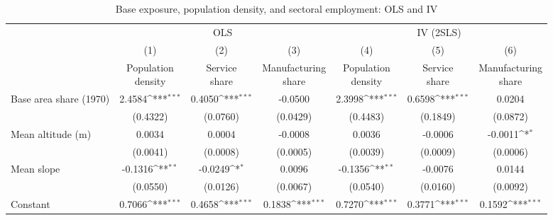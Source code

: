 \documentclass[12pt, unicode, a4paper]{article}
\newcommand{\1}{\mbox{1}\hspace{-0.25em}\mbox{l}} %
\begin{document}
\clearpage
\begin{table}[H]
\centering
\begin{threeparttable}
\caption{Base exposure, population density, and sectoral employment: OLS and IV}
\label{tab:base-location-ols-iv}
\small
\setlength{\tabcolsep}{3pt}
\def\sym#1{\ifmmode^{#1}\else\(^{#1}\)\fi}
\begin{tabular*}{\linewidth}{@{\extracolsep{\fill}}l*{6}{c}@{}}
\toprule
&\multicolumn{3}{c}{OLS}&\multicolumn{3}{c}{IV (2SLS)}\\
\cmidrule(lr){2-4}\cmidrule(lr){5-7}
& (1) & (2) & (3) & (4) & (5) & (6)\\
& \shortstack{Population\\density} & \shortstack{Service\\share} & \shortstack{Manufacturing\\share}
& \shortstack{Population\\density} & \shortstack{Service\\share} & \shortstack{Manufacturing\\share}\\
\midrule
Base area share (1970)    &        2.4584\sym{***}&        0.4050\sym{***}&       -0.0500         &        2.3998\sym{***}&        0.6598\sym{***}&        0.0204         \\
                          &      (0.4322)         &      (0.0760)         &      (0.0429)         &      (0.4483)         &      (0.1849)         &      (0.0872)         \\
Mean altitude (m)         &        0.0034         &        0.0004         &       -0.0008         &        0.0036         &       -0.0006         &       -0.0011\sym{*}  \\
                          &      (0.0041)         &      (0.0008)         &      (0.0005)         &      (0.0039)         &      (0.0009)         &      (0.0006)         \\
Mean slope                &       -0.1316\sym{**} &       -0.0249\sym{*}  &        0.0096         &       -0.1356\sym{**} &       -0.0076         &        0.0144         \\
                          &      (0.0550)         &      (0.0126)         &      (0.0067)         &      (0.0540)         &      (0.0160)         &      (0.0092)         \\
Constant                  &        0.7066\sym{***}&        0.4658\sym{***}&        0.1838\sym{***}&        0.7270\sym{***}&        0.3771\sym{***}&        0.1592\sym{***}\\

\end{tabular*}
\end{threeparttable}
\end{table}
\end{document}
